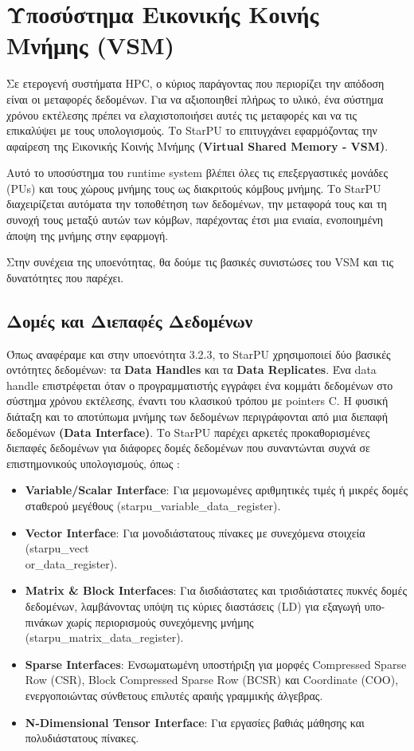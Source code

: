 \section{Υποσύστημα Εικονικής Κοινής Μνήμης (VSM)}

Σε ετερογενή συστήματα HPC, ο κύριος παράγοντας που περιορίζει την απόδοση είναι οι μεταφορές δεδομένων. Για να αξιοποιηθεί πλήρως το υλικό, ένα σύστημα χρόνου εκτέλεσης πρέπει να ελαχιστοποιήσει αυτές τις μεταφορές και να τις επικαλύψει με τους υπολογισμούς. Το StarPU το επιτυγχάνει εφαρμόζοντας την αφαίρεση της Εικονικής Κοινής Μνήμης \textbf{(Virtual Shared Memory - VSM)}. 

Αυτό το υποσύστημα του runtime system βλέπει όλες τις επεξεργαστικές μονάδες (PUs) και τους χώρους μνήμης τους ως διακριτούς κόμβους μνήμης. Το StarPU διαχειρίζεται αυτόματα την τοποθέτηση των δεδομένων, την μεταφορά τους και τη συνοχή τους μεταξύ αυτών των κόμβων, παρέχοντας έτσι μια ενιαία, ενοποιημένη άποψη της μνήμης στην εφαρμογή. 

Στην συνέχεια της υποενότητας, θα δούμε τις βασικές συνιστώσες του VSM και τις δυνατότητες που παρέχει. 

\subsection{Δομές και Διεπαφές Δεδομένων}

Όπως αναφέραμε και στην υποενότητα 3.2.3, το StarPU χρησιμοποιεί δύο βασικές οντότητες δεδομένων: τα \textbf{Data Handles} και τα \textbf{Data Replicates}. Ένα data handle επιστρέφεται όταν ο προγραμματιστής εγγράφει ένα κομμάτι δεδομένων στο σύστημα χρόνου εκτέλεσης, έναντι του κλασικού τρόπου με pointers C. Η φυσική διάταξη και το αποτύπωμα μνήμης των δεδομένων περιγράφονται από μια διεπαφή δεδομένων \textbf{(Data Interface)}. Το StarPU παρέχει αρκετές προκαθορισμένες διεπαφές δεδομένων για διάφορες δομές δεδομένων που συναντώνται συχνά σε επιστημονικούς υπολογισμούς, όπως \cite{starpu2025handbook, starpu_dev_manual}:

\begin{itemize}
  \item \textbf{Variable/Scalar Interface}: Για μεμονωμένες αριθμητικές τιμές ή μικρές δομές σταθερού μεγέθους (starpu\_variable\_data\_register).
  \item \textbf{Vector Interface}: Για μονοδιάστατους πίνακες με συνεχόμενα στοιχεία (starpu\_vect\\or\_data\_register).
  \item \textbf{Matrix \& Block Interfaces}: Για δισδιάστατες και τρισδιάστατες πυκνές δομές δεδομένων, λαμβάνοντας υπόψη τις κύριες διαστάσεις (LD) για εξαγωγή υπο-πινάκων χωρίς περιορισμούς συνεχόμενης μνήμης (starpu\_matrix\_data\_register).
  \item \textbf{Sparse Interfaces}: Ενσωματωμένη υποστήριξη για μορφές Compressed Sparse Row (CSR), Block Compressed Sparse Row (BCSR) και Coordinate (COO), ενεργοποιώντας σύνθετους επιλυτές αραιής γραμμικής άλγεβρας.
  \item \textbf{N-Dimensional Tensor Interface}: Για εργασίες βαθιάς μάθησης και πολυδιάστατους πίνακες.
\end{itemize}

